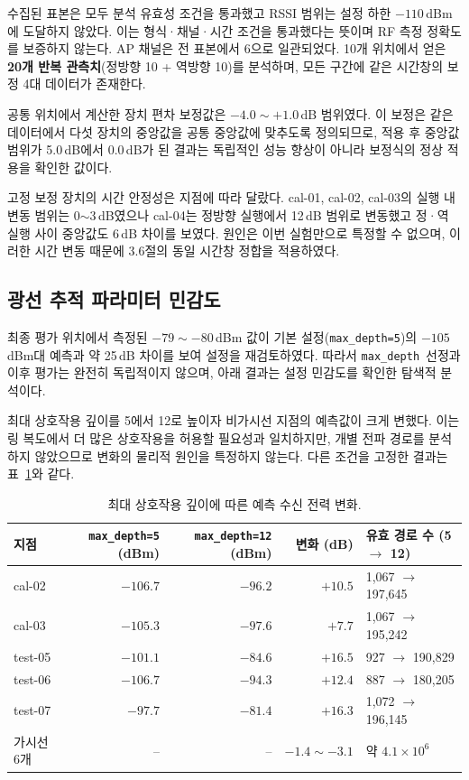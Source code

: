 \documentclass[11pt,a4paper]{article}
\newcommand{\md}{\texttt{max\_depth}}
\begin{document}
수집된 표본은 모두 분석 유효성 조건을 통과했고 RSSI 범위는 설정 하한 $-110$\,dBm에 도달하지 않았다.
이는 형식·채널·시간 조건을 통과했다는 뜻이며 RF 측정 정확도를 보증하지 않는다. AP 채널은 전 표본에서
6으로 일관되었다. 10개 위치에서 얻은 \textbf{20개 반복 관측치}(정방향 10 + 역방향 10)를 분석하며,
모든 구간에 같은 시간창의 보정 4대 데이터가 존재한다.

공통 위치에서 계산한 장치 편차 보정값은 $-4.0 \sim +1.0$\,dB 범위였다. 이 보정은 같은 데이터에서 다섯
장치의 중앙값을 공통 중앙값에 맞추도록 정의되므로, 적용 후 중앙값 범위가 5.0\,dB에서 0.0\,dB가 된
결과는 독립적인 성능 향상이 아니라 보정식의 정상 적용을 확인한 값이다.

고정 보정 장치의 시간 안정성은 지점에 따라 달랐다. cal-01, cal-02, cal-03의 실행 내 변동 범위는
0$\sim$3\,dB였으나 cal-04는 정방향 실행에서 12\,dB 범위로 변동했고 정·역 실행 사이 중앙값도 6\,dB
차이를 보였다. 원인은 이번 실험만으로 특정할 수 없으며, 이러한 시간 변동 때문에 3.6절의 동일 시간창
정합을 적용하였다.

\subsection{광선 추적 파라미터 민감도}

최종 평가 위치에서 측정된 $-79 \sim -80$\,dBm 값이 기본 설정(\texttt{max\_depth=5})의
$-105$\,dBm대 예측과 약 25\,dB 차이를 보여 설정을 재검토하였다. 따라서 \md\ 선정과 이후 평가는 완전히
독립적이지 않으며, 아래 결과는 설정 민감도를 확인한 탐색적 분석이다.

최대 상호작용 깊이를 5에서 12로 높이자 비가시선 지점의 예측값이 크게 변했다. 이는 링 복도에서 더 많은
상호작용을 허용할 필요성과 일치하지만, 개별 전파 경로를 분석하지 않았으므로 변화의 물리적 원인을 특정하지
않는다. 다른 조건을 고정한 결과는 표~\ref{tab:depth}와 같다.

\begin{table}[htbp]
  \centering\small
  \caption{최대 상호작용 깊이에 따른 예측 수신 전력 변화.}
  \label{tab:depth}
  \begin{tabular}{@{}lrrrl@{}}
    \toprule
    지점 & \texttt{max\_depth=5} (dBm) & \texttt{max\_depth=12} (dBm) & 변화 (dB) & 유효 경로 수 (5 $\rightarrow$ 12) \\
    \midrule
    cal-02   & $-106.7$ & $-96.2$ & $+10.5$ & 1,067 $\rightarrow$ 197,645 \\
    cal-03   & $-105.3$ & $-97.6$ & $+7.7$  & 1,067 $\rightarrow$ 195,242 \\
    test-05  & $-101.1$ & $-84.6$ & $+16.5$ & 927 $\rightarrow$ 190,829 \\
    test-06  & $-106.7$ & $-94.3$ & $+12.4$ & 887 $\rightarrow$ 180,205 \\
    test-07  & $-97.7$  & $-81.4$ & $+16.3$ & 1,072 $\rightarrow$ 196,145 \\
    가시선 6개 & -- & -- & $-1.4 \sim -3.1$ & 약 $4.1\times10^{6}$ \\
    \bottomrule
  \end{tabular}
\end{table}
\end{document}
